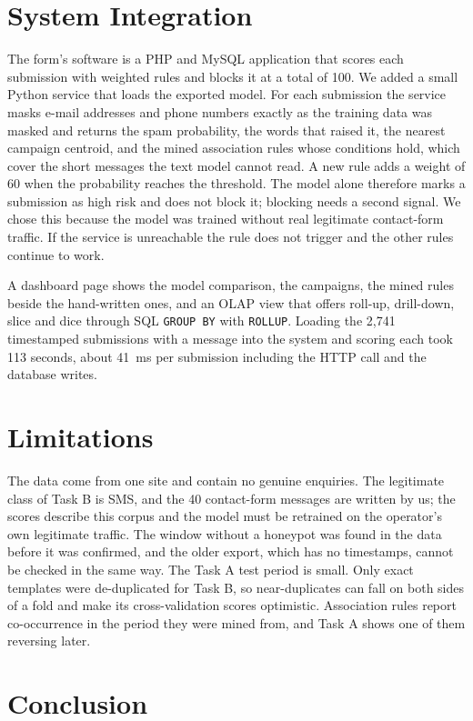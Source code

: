 \documentclass[conference]{IEEEtran}
\begin{document}
\section{System Integration}

The form's software is a PHP and MySQL application that scores each submission with weighted rules and blocks
it at a total of 100. We added a small Python service that loads the exported model. For each submission the
service masks e-mail addresses and phone numbers exactly as the training data was masked and returns the spam
probability, the words that raised it, the nearest campaign centroid, and the mined association rules whose
conditions hold, which cover the short messages the text model cannot read. A new rule adds a weight of 60 when the probability reaches the threshold. The model alone
therefore marks a submission as high risk and does not block it; blocking needs a second signal. We chose this
because the model was trained without real legitimate contact-form traffic. If the service is unreachable the
rule does not trigger and the other rules continue to work.

A dashboard page shows the model comparison, the campaigns, the mined rules beside the hand-written ones, and
an OLAP view that offers roll-up, drill-down, slice and dice through SQL \texttt{GROUP BY} with
\texttt{ROLLUP}. Loading the 2,741 timestamped submissions with a message into the system and scoring each
took 113 seconds, about 41~ms per submission including the HTTP call and the database writes.

\section{Limitations}

The data come from one site and contain no genuine enquiries. The legitimate class of Task B is SMS, and the 40
contact-form messages are written by us; the scores describe this corpus and the model must be retrained on
the operator's own legitimate traffic. The window without a honeypot was found in the data before it was confirmed, and the
older export, which has no timestamps, cannot be checked in the same way. The Task A test period is small. Only exact templates were de-duplicated for Task B, so
near-duplicates can fall on both sides of a fold and make its cross-validation scores optimistic. Association
rules report co-occurrence in the period they were mined from, and Task A shows one of them reversing later.

\section{Conclusion}
\end{document}
